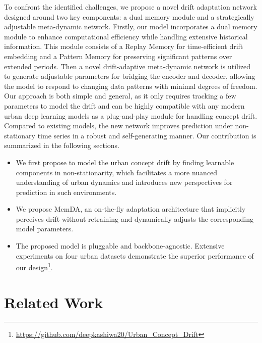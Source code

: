 \documentclass[sigconf]{acmart}
\begin{document}
To confront the identified challenges, we propose a novel drift adaptation network designed around two key components: a dual memory module and a strategically adjustable meta-dynamic network. Firstly, our model incorporates a dual memory module to enhance computational efficiency while handling extensive historical information. This module consists of a Replay Memory for time-efficient drift embedding and a Pattern Memory for preserving significant patterns over extended periods. Then a novel drift-adaptive meta-dynamic network is utilized to generate adjustable parameters for bridging the encoder and decoder, allowing the model to respond to changing data patterns with minimal degrees of freedom. Our approach is both simple and general, as it only requires tracking a few parameters to model the drift and can be highly compatible with any modern urban deep learning models as a plug-and-play module for handling concept drift. Compared to existing models, the new network improves prediction under non-stationary time series in a robust and self-generating manner. Our contribution is summarized in the following sections.

\begin{itemize}
    \item We first propose to model the urban concept drift by finding learnable components in non-stationarity, which facilitates a more nuanced understanding of urban dynamics and introduces new perspectives for prediction in such environments.
    \item We propose MemDA, an on-the-fly adaptation architecture that implicitly perceives drift without retraining and dynamically adjusts the corresponding model parameters. 
    \item The proposed model is pluggable and backbone-agnostic. Extensive experiments on four urban datasets demonstrate the superior performance of our design\footnote{\url{https://github.com/deepkashiwa20/Urban_Concept_Drift}}.
\end{itemize}

\section{Related Work}
\end{document}
